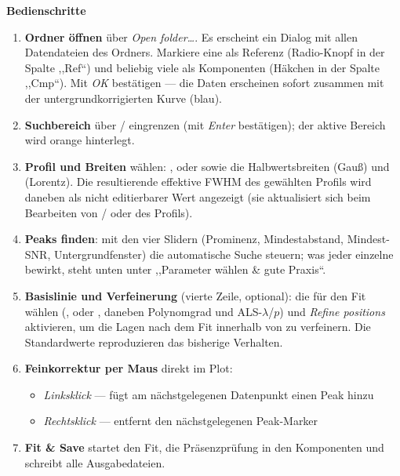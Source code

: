 \documentclass[11pt,a4paper]{article}
\begin{document}
\noindent\textbf{Bedienschritte}
\begin{enumerate}
\item \textbf{Ordner \"offnen} \"uber \emph{Open folder\dots}. Es erscheint ein
Dialog mit allen Datendateien des Ordners. Markiere eine als Referenz
(Radio-Knopf in der Spalte ,,Ref``) und beliebig viele als Komponenten (H\"akchen
in der Spalte ,,Cmp``). Mit \emph{OK} best\"atigen --- die Daten erscheinen sofort
zusammen mit der untergrundkorrigierten Kurve (blau).
\item \textbf{Suchbereich} \"uber / eingrenzen (mit
\emph{Enter} best\"atigen); der aktive Bereich wird orange hinterlegt.
\item \textbf{Profil und Breiten} w\"ahlen: ,  oder
 sowie die Halbwertsbreiten  (Gau\ss) und 
(Lorentz). Die resultierende effektive FWHM des gew\"ahlten Profils wird daneben
als nicht editierbarer Wert angezeigt (sie aktualisiert sich beim Bearbeiten von
/ oder des Profils).
\item \textbf{Peaks finden}: mit den vier Slidern (Prominenz, Mindestabstand,
Mindest-SNR, Untergrundfenster) die automatische Suche steuern; was jeder einzelne
bewirkt, steht unten unter ,,Parameter w\"ahlen \& gute Praxis``.
\item \textbf{Basislinie und Verfeinerung} (vierte Zeile, optional): die
 f\"ur den Fit w\"ahlen (,
 oder , daneben Polynomgrad und ALS-$\lambda$/$p$) und
\emph{Refine positions} aktivieren, um die Lagen nach dem Fit innerhalb von
 zu verfeinern. Die Standardwerte reproduzieren das bisherige
Verhalten.
\item \textbf{Feinkorrektur per Maus} direkt im Plot:
  \begin{itemize}
  \item \emph{Linksklick} --- f\"ugt am n\"achstgelegenen Datenpunkt einen Peak hinzu
  \item \emph{Rechtsklick} --- entfernt den n\"achstgelegenen Peak-Marker
  \end{itemize}
\item \textbf{Fit \& Save} startet den Fit, die Pr\"asenzpr\"ufung in den
Komponenten und schreibt alle Ausgabedateien.
\end{enumerate}

\noindent{}
\end{document}
